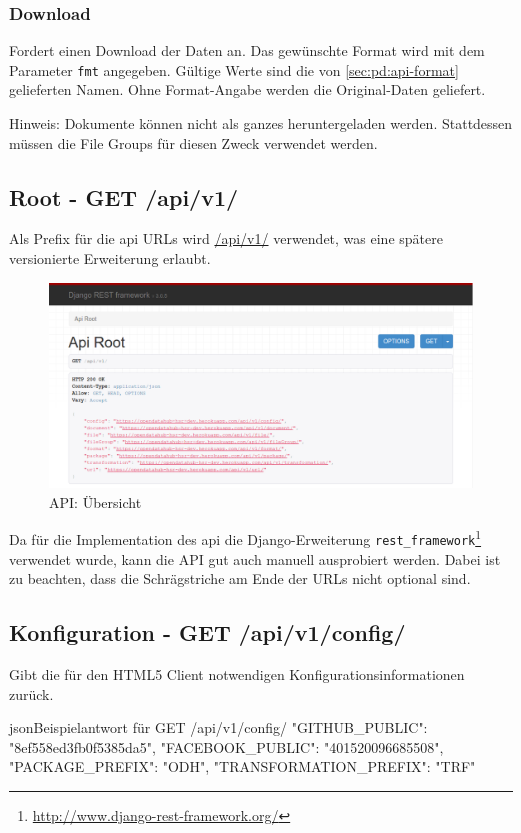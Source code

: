 \subsubsection{Download} \label{sec:pd:api-download}
Fordert einen Download der Daten an. Das gewünschte Format wird mit dem Parameter \texttt{fmt} angegeben. Gültige Werte sind die von \cref{sec:pd:api-format} gelieferten Namen. Ohne Format-Angabe werden die Original-Daten geliefert.

Hinweis: Dokumente können nicht als ganzes heruntergeladen werden. Stattdessen müssen die File Groups für diesen Zweck verwendet werden.

\subsection{Root - GET /api/v1/}
Als Prefix für die \gls{api} URLs wird \url{/api/v1/} verwendet, was eine spätere versionierte Erweiterung erlaubt.
\begin{figure}[H]
\centering
\includegraphics[width=\linewidth]{fig/api-root}
\caption{API: Übersicht}
\label{fig:pd:api-root}
\end{figure}

Da für die Implementation des \gls{api} die Django-Erweiterung \texttt{rest\_framework}\footnote{\url{http://www.django-rest-framework.org/}} verwendet wurde, kann die API gut auch manuell ausprobiert werden. Dabei ist zu beachten, dass die Schrägstriche am Ende der URLs nicht optional sind.

\subsection{Konfiguration - GET /api/v1/config/}
Gibt die für den HTML5 Client notwendigen Konfigurationsinformationen zurück.

\begin{srclst}{json}{Beispielantwort für GET /api/v1/config/}
{
  "GITHUB_PUBLIC": "8ef558ed3fb0f5385da5", 
  "FACEBOOK_PUBLIC": "401520096685508", 
  "PACKAGE_PREFIX": "ODH", 
  "TRANSFORMATION_PREFIX": "TRF"
}
\end{srclst}

